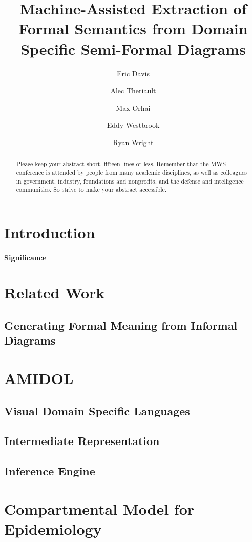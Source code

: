 \documentclass[11pt]{article}
\date{\vspace{-5ex}}
\author[1]{Eric Davis}
\author[1]{Alec Theriault}
\author[1]{Max Orhai}
\author[1]{Eddy Westbrook}
\author[1]{Ryan Wright}
\affil[1]{Galois, Inc}
\title{Machine-Assisted Extraction of Formal Semantics from Domain Specific Semi-Formal Diagrams}
\begin{document}
\maketitle
\vspace{10pt}
\begin{abstract}
Please keep your abstract short, fifteen lines or less.  Remember that the MWS conference is attended by people from many academic disciplines, as well as colleagues in government, industry, foundations and nonprofits, and the defense and intelligence communities.  So strive to make your abstract accessible.
\end{abstract}

\section{Introduction}

\paragraph{Significance}

\section{Related Work}

\subsection{Generating Formal Meaning from Informal Diagrams}

\section{AMIDOL}

\subsection{Visual Domain Specific Languages}

\subsection{Intermediate Representation}

\subsection{Inference Engine}

\section{Compartmental Model for Epidemiology}
\end{document}
